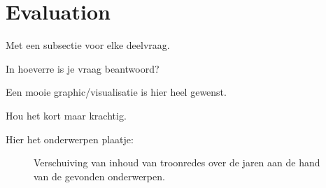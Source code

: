 \section{Evaluation}
\label{sec:eva}

Met een subsectie voor elke deelvraag.

In hoeverre is je vraag beantwoord?

Een mooie graphic/visualisatie is hier heel gewenst.

Hou het kort maar krachtig.

Hier het onderwerpen plaatje:
\begin{figure}[h]
\begin{center}
\caption{\label{fig:Onderwerpverdeling} Verschuiving van inhoud van troonredes over de jaren aan de hand van de gevonden onderwerpen.}
\end{center}
\end{figure}